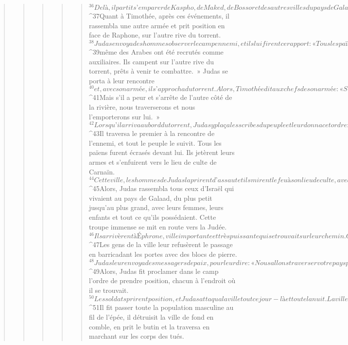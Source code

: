 \begin{verse}
\begin{verse}
\begin{verse}
\begin{verse}
\begin{verse}
${}^{36}De là, il partit s’emparer de Kaspho, de Maked, de Bossor et des autres villes du pays de Galaad.
${}^{37}Quant à Timothée, après ces événements, il rassembla une autre armée et prit position en face de Raphone, sur l’autre rive du torrent. 
${}^{38}Judas envoya des hommes observer le camp ennemi, et ils lui firent ce rapport : « Tous les païens des alentours sont rassemblés auprès de Timothée. C’est une armée très nombreuse : 
${}^{39}même des Arabes ont été recrutés comme auxiliaires. Ils campent sur l’autre rive du torrent, prêts à venir te combattre. » Judas se porta à leur rencontre 
${}^{40}et, avec son armée, il s’approcha du torrent. Alors, Timothée dit aux chefs de son armée : « S’il traverse le premier, nous ne pourrons pas lui résister, car il aura un grand avantage sur nous. 
${}^{41}Mais s’il a peur et s’arrête de l’autre côté de la rivière, nous traverserons et nous l’emporterons sur lui. » 
${}^{42}Lorsqu’il arriva au bord du torrent, Judas y plaça les scribes du peuple et leur donna cet ordre : « Ne laissez personne s’installer ici, mais que tous les hommes aillent au combat. » 
${}^{43}Il traversa le premier à la rencontre de l’ennemi, et tout le peuple le suivit. Tous les païens furent écrasés devant lui. Ils jetèrent leurs armes et s’enfuirent vers le lieu de culte de Carnaïn. 
${}^{44}Cette ville, les hommes de Judas la prirent d’assaut et ils mirent le feu à son lieu de culte, avec tous ceux qui s’y trouvaient. Carnaïn fut renversée. Dès ce moment, il ne fut plus possible de résister à Judas Maccabée.
${}^{45}Alors, Judas rassembla tous ceux d’Israël qui vivaient au pays de Galaad, du plus petit jusqu’au plus grand, avec leurs femmes, leurs enfants et tout ce qu’ils possédaient. Cette troupe immense se mit en route vers la Judée. 
${}^{46}Ils arrivèrent à Éphrone, ville importante et très puissante qui se trouvait sur leur chemin. On ne pouvait la contourner ni à droite ni à gauche ; il fallait la traverser. 
${}^{47}Les gens de la ville leur refusèrent le passage en barricadant les portes avec des blocs de pierre. 
${}^{48}Judas leur envoya des messagers de paix, pour leur dire : « Nous allons traverser votre pays pour aller dans le nôtre. Personne ne vous fera de mal. Nous ne ferons que passer à pied. » Mais ils ne voulaient pas lui ouvrir. 
${}^{49}Alors, Judas fit proclamer dans le camp l’ordre de prendre position, chacun à l’endroit où il se trouvait. 
${}^{50}Les soldats prirent position, et Judas attaqua la ville tout ce jour-là et toute la nuit. La ville tomba entre ses mains. 
${}^{51}Il fit passer toute la population masculine au fil de l’épée, il détruisit la ville de fond en comble, en prit le butin et la traversa en marchant sur les corps des tués. 

\end{verse}
\end{verse}
\end{verse}
\end{verse}
\end{verse}
